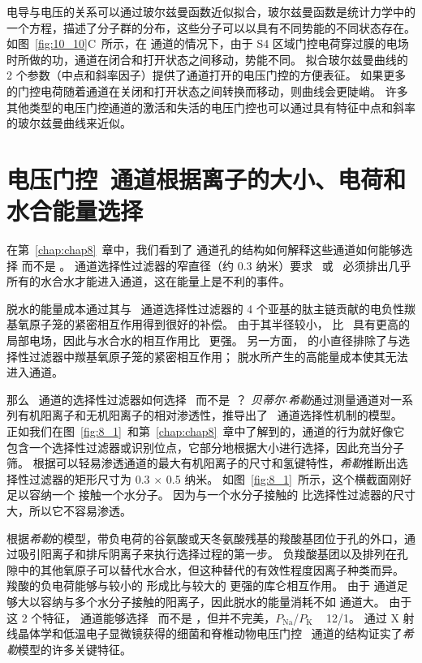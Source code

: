 电导与电压的关系可以通过玻尔兹曼函数近似拟合，玻尔兹曼函数是统计力学中的一个方程，描述了分子群的分布，这些分子可以以具有不同势能的不同状态存在。
如图~\ref{fig:10_10}C~所示，在  通道的情况下，由于 S4 区域门控电荷穿过膜的电场时所做的功，通道在闭合和打开状态之间移动，势能不同。
拟合玻尔兹曼曲线的 2 个参数（中点和斜率因子）提供了通道打开的电压门控的方便表征。
如果更多的门控电荷随着通道在关闭和打开状态之间转换而移动，则曲线会更陡峭。
许多其他类型的电压门控通道的激活和失活的电压门控也可以通过具有特征中点和斜率的玻尔兹曼曲线来近似。


\section{电压门控~通道根据离子的大小、电荷和水合能量选择~}

在第~\ref{chap:chap8}~章中，我们看到了  通道孔的结构如何解释这些通道如何能够选择  而不是 。
 通道选择性过滤器的窄直径（约 0.3 纳米）要求~ 或~ 必须排出几乎所有的水合水才能进入通道，这在能量上是不利的事件。


 脱水的能量成本通过其与~ 通道选择性过滤器的 4 个亚基的肽主链贡献的电负性羰基氧原子笼的紧密相互作用得到很好的补偿。
由于其半径较小， 比~ 具有更高的局部电场，因此与水合水的相互作用比~ 更强。
另一方面， 的小直径排除了与选择性过滤器中羰基氧原子笼的紧密相互作用；
 脱水所产生的高能量成本使其无法进入通道。


那么~ 通道的选择性过滤器如何选择~ 而不是~？
\textit{贝蒂尔$\cdot$希勒}通过测量通道对一系列有机阳离子和无机阳离子的相对渗透性，推导出了~ 通道选择性机制的模型。
正如我们在图~\ref{fig:8_1}~和第~\ref{chap:chap8}~章中了解到的，通道的行为就好像它包含一个选择性过滤器或识别位点，它部分地根据大小进行选择，因此充当分子筛。
根据可以轻易渗透通道的最大有机阳离子的尺寸和氢键特性，\textit{希勒}推断出选择性过滤器的矩形尺寸为 0.3 $\times$ 0.5 纳米。
如图~\ref{fig:8_1}~所示，这个横截面刚好足以容纳一个  接触一个水分子。
因为与一个水分子接触的  比选择性过滤器的尺寸大，所以它不容易渗透。


根据\textit{希勒}的模型，带负电荷的谷氨酸或天冬氨酸残基的羧酸基团位于孔的外口，通过吸引阳离子和排斥阴离子来执行选择过程的第一步。
负羧酸基团以及排列在孔隙中的其他氧原子可以替代水合水，但这种替代的有效性程度因离子种类而异。
羧酸的负电荷能够与较小的  形成比与较大的  更强的库仑相互作用。
由于  通道足够大以容纳与多个水分子接触的阳离子，因此脱水的能量消耗不如  通道大。
由于这 2 个特征， 通道能够选择~ 而不是 ，但并不完美，$P_\text{Na}$/$P_\text{K}$ ~ 12/1。
通过 X 射线晶体学和低温电子显微镜获得的细菌和脊椎动物电压门控~ 通道的结构证实了\textit{希勒}模型的许多关键特征。



